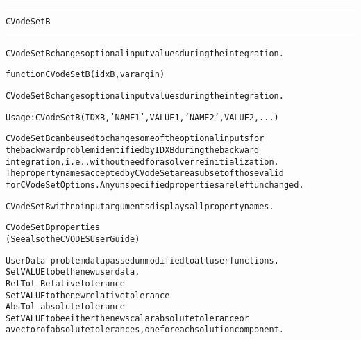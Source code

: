 \begin{samepage}
\hrule
\begin{center}
{\large \verb!CVodeSetB!}
\label{p:CVodeSetB}
\end{center}
\hrule\vspace{0.1in}



\begin{alltt}
CVodeSetB changes optional input values during the integration.
\end{alltt}

\end{samepage}



\begin{samepage}


\begin{alltt}
function CVodeSetB(idxB, varargin) 
\end{alltt}

\end{samepage}



\begin{alltt}
CVodeSetB changes optional input values during the integration.

   Usage: CVodeSetB( IDXB, 'NAME1',VALUE1,'NAME2',VALUE2,... )

   CVodeSetB can be used to change some of the optional inputs for
   the backward problem identified by IDXB during the backward
   integration, i.e., without need for a solver reinitialization.
   The property names accepted by CVodeSet are a subset of those valid
   for CVodeSetOptions. Any unspecified properties are left unchanged.
   
   CVodeSetB with no input arguments displays all property names.

CVodeSetB properties
(See also the CVODES User Guide)

UserData - problem data passed unmodified to all user functions.
  Set VALUE to be the new user data.
RelTol - Relative tolerance
  Set VALUE to the new relative tolerance
AbsTol - absolute tolerance
  Set VALUE to be either the new scalar absolute tolerance or
  a vector of absolute tolerances, one for each solution component.
\end{alltt}






\vspace{0.1in}